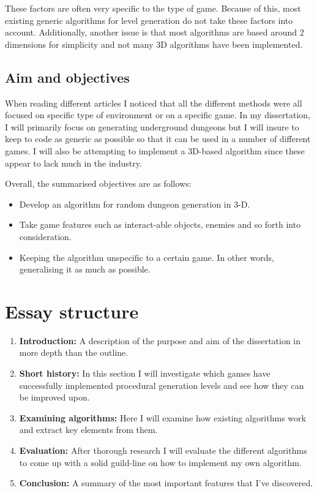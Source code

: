 \documentclass{ueacmpstyle}
\begin{document}
These factors are often very specific to the type of game. Because of this, most existing generic algorithms for level generation do not take these factors into account. Additionally, another issue is that most algorithms are based around 2 dimensions for simplicity and not many 3D algorithms have been implemented.

\subsection{Aim and objectives}
When reading different articles I noticed that all the different methods were all focused on specific type of environment or on a specific game. In my dissertation, I will primarily focus on generating underground dungeons but I will insure to keep to code as generic as possible so that it can be used in a number of different games. I will also be attempting to implement a 3D-based algorithm since these appear to lack much in the industry.

Overall, the summarised objectives are as follows:
\begin{itemize}
\item Develop an algorithm for random dungeon generation in 3-D.
\item Take game features such as interact-able objects, enemies and so forth into consideration.
\item Keeping the algorithm unspecific to a certain game. In other words, generalising it as much as possible.
\end{itemize}

\section{Essay structure}

\begin{enumerate}
\item {\bf Introduction:} A description of the purpose and aim of the dissertation in more depth than the outline.
\item {\bf Short history:} In this section I will investigate which games have successfully implemented procedural generation levels and see how they can be improved upon.
\item {\bf Examining algorithms:} Here I will examine how existing algorithms work and extract key elements from them.
\item {\bf Evaluation:} After thorough research I will evaluate the different algorithms to come up with a solid guild-line on how to implement my own algorithm.
\item {\bf Conclusion:} A summary of the most important features that I've discovered.
\end{enumerate}
\end{document}
